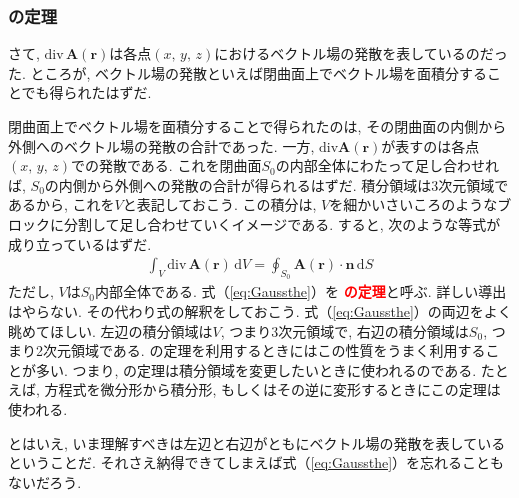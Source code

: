 \subsubsection{の定理}
さて, $\mathrm{div} \, \bm{A}(\bm{r})$は各点$(x, \, y, \, z)$におけるベクトル場の発散を表しているのだった. 
ところが, ベクトル場の発散といえば閉曲面上でベクトル場を面積分することでも得られたはずだ. 

閉曲面上でベクトル場を面積分することで得られたのは, その閉曲面の内側から外側へのベクトル場の発散の合計であった. 
一方, $\mathrm{div}\bm{A}(\bm{r})$が表すのは各点$(x, \, y, \, z)$での発散である. 
これを閉曲面$S_0$の内部全体にわたって足し合わせれば, $S_0$の内側から外側への発散の合計が得られるはずだ. 
積分領域は3次元領域であるから, これを$V$と表記しておこう. 
この積分は, $V$を細かいさいころのようなブロックに分割して足し合わせていくイメージである.  
すると, 次のような等式が成り立っているはずだ. 
\begin{eqnarray}
\int_V \mathrm{div} \, \bm{A}(\bm{r}) \, \mathrm{d}V = \oint_{S_0} \bm{A}(\bm{r}) \cdot \bm{n} \, \mathrm{d}S
\label{eq:Gaussthe}
\end{eqnarray}
ただし, $V$は$S_0$内部全体である. 式（\ref{eq:Gaussthe}）を
\textbf{\textcolor{red}{の定理}}と呼ぶ. 
詳しい導出はやらない. その代わり式の解釈をしておこう. 式（\ref{eq:Gaussthe}）の両辺をよく眺めてほしい. 
左辺の積分領域は$V$, つまり3次元領域で, 右辺の積分領域は$S_0$, つまり2次元領域である. 
の定理を利用するときにはこの性質をうまく利用することが多い. 
つまり, の定理は積分領域を変更したいときに使われるのである. 
たとえば, 方程式を微分形から積分形, もしくはその逆に変形するときにこの定理は使われる. 

とはいえ, いま理解すべきは左辺と右辺がともにベクトル場の発散を表しているということだ. 
それさえ納得できてしまえば式（\ref{eq:Gaussthe}）を忘れることもないだろう. 
